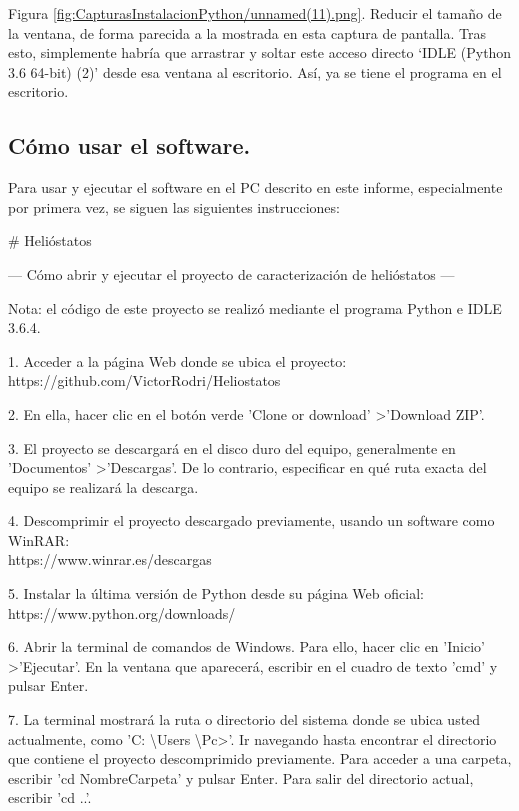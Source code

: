 Figura \ref{fig:CapturasInstalacionPython/unnamed(11).png}. Reducir el tamaño de la ventana, de forma parecida a la mostrada en esta captura de pantalla. Tras esto, simplemente habría que arrastrar y soltar este acceso directo ‘IDLE (Python 3.6 64-bit) (2)’ desde esa ventana al escritorio. Así, ya se tiene el programa en el escritorio.\\[20pt]

\subsection{Cómo usar el software.}

Para usar y ejecutar el software en el PC descrito en este informe, especialmente por primera vez, se siguen las siguientes instrucciones:

\# Helióstatos

--- Cómo abrir y ejecutar el proyecto de caracterización de helióstatos ---

Nota: el código de este proyecto se realizó mediante el programa Python e IDLE 3.6.4.

1. Acceder a la página Web donde se ubica el proyecto:\\
https://github.com/VictorRodri/Heliostatos

2. En ella, hacer clic en el botón verde 'Clone or download' \textgreater 'Download ZIP'.

3. El proyecto se descargará en el disco duro del equipo, generalmente en 'Documentos' \textgreater 'Descargas'. De lo contrario, especificar en qué ruta exacta del equipo se realizará la descarga.

4. Descomprimir el proyecto descargado previamente, usando un software como WinRAR:\\
https://www.winrar.es/descargas

5. Instalar la última versión de Python desde su página Web oficial:\\
https://www.python.org/downloads/

6. Abrir la terminal de comandos de Windows. Para ello, hacer clic en 'Inicio' \textgreater 'Ejecutar'. En la ventana que aparecerá, escribir en el cuadro de texto 'cmd' y pulsar Enter.

7. La terminal mostrará la ruta o directorio del sistema donde se ubica usted actualmente, como 'C: \textbackslash Users \textbackslash Pc\textgreater'. Ir navegando hasta encontrar el directorio que contiene el proyecto descomprimido previamente. Para acceder a una carpeta, escribir 'cd NombreCarpeta' y pulsar Enter. Para salir del directorio actual, escribir 'cd ..'.

